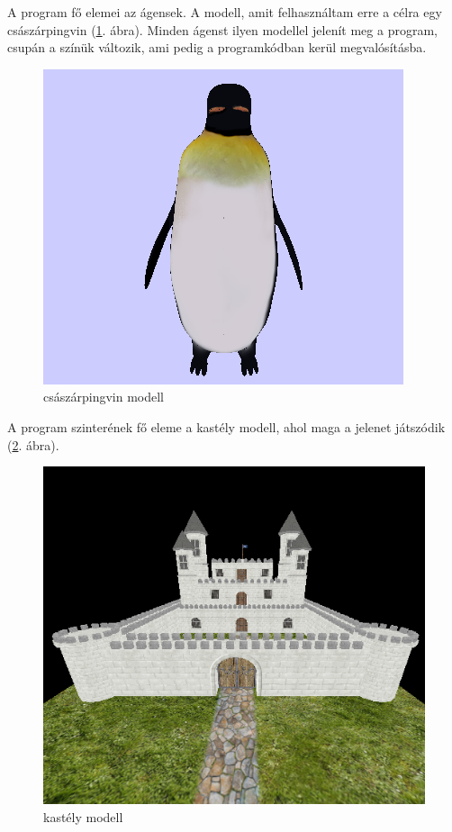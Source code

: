 A program fő elemei az ágensek. 
A modell, amit felhasználtam erre a célra egy császárpingvin (\ref{fig:pingvin}. ábra). 
Minden ágenst ilyen modellel jelenít meg a program, csupán a színük változik, ami pedig a programkódban kerül megvalósításba.

\begin{figure}[htp]
    \centering
   	\includegraphics[scale=0.6]{images/pingvin.png}
	\caption{császárpingvin modell}
	\label{fig:pingvin}
\end{figure}

A program szinterének fő eleme a kastély modell, ahol maga a jelenet játszódik (\ref{fig:castle}. ábra).

\begin{figure}[htp]
    \centering
   	\includegraphics[scale=0.7]{images/castle.png}
	\caption{kastély modell}
	\label{fig:castle}
\end{figure}

